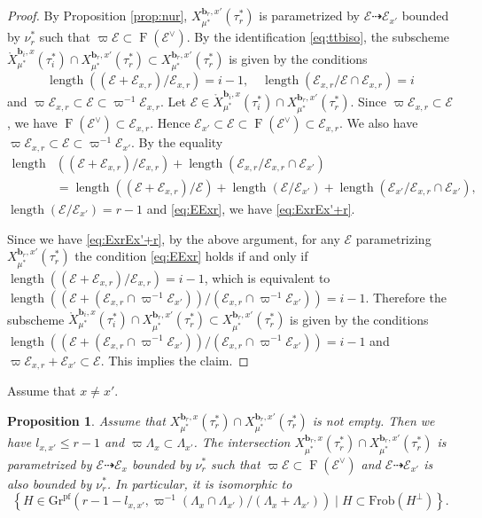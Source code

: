 \documentclass[12pt,a4paper]{article}
\newtheorem{prop}[thm]{Proposition}
\DeclareMathOperator{\length}{length}
\DeclareMathOperator{\oF}{F}
\newcommand{\bfb}{\mathbf{b}}
\newcommand{\cE}{\mathcal{E}}
\newcommand{\pf}{\mathrm{pf}}
\begin{document}
\begin{proof}
By Proposition \ref{prop:nur}, 
$X_{\mu^*}^{\bfb_r,x'}(\tau_r^*)$ is parametrized by $\cE \dashrightarrow \cE_{x'}$ 
bounded by $\nu_r^*$ such that $\varpi \cE \subset \oF (\cE^{\vee})$. 
By the identification \eqref{eq:ttbiso}, the subscheme 
$\mathring{X}_{\mu^*}^{\bfb_i,x}(\tau_i^*) \cap X_{\mu^*}^{\bfb_r,x'}(\tau_r^*) \subset X_{\mu^*}^{\bfb_r,x'}(\tau_r^*)$ is given by the conditions 
\begin{equation}\label{eq:EExr}
\length ((\cE +\cE_{x,r})/\cE_{x,r})=i-1, \quad 
\length (\cE_{x,r}/\cE \cap \cE_{x,r})=i 
\end{equation}
and $\varpi \cE_{x,r} \subset \cE \subset \varpi^{-1} \cE_{x,r}$. 
Let $\cE \in \mathring{X}_{\mu^*}^{\bfb_i,x}(\tau_i^*) \cap X_{\mu^*}^{\bfb_r,x'}(\tau_r^*)$. 
Since $\varpi \cE_{x,r} \subset \cE$, we have 
$\oF (\cE^{\vee}) \subset \cE_{x,r}$. Hence $\cE_{x'} \subset \cE \subset \oF (\cE^{\vee}) \subset \cE_{x,r}$. 
We also have $\varpi \cE_{x,r} \subset \cE \subset \varpi^{-1} \cE_{x'}$. 
By the equality 
\begin{align*}
\length & ((\cE+\cE_{x,r})/\cE_{x,r})+\length (\cE_{x,r}/\cE_{x,r} \cap \cE_{x'}) \\ 
 &= 
\length ((\cE+\cE_{x,r})/\cE) +\length (\cE /\cE_{x'}) + \length (\cE_{x'}/\cE_{x,r} \cap \cE_{x'}) , 
\end{align*}
$\length (\cE /\cE_{x'})=r-1$ and \eqref{eq:EExr}, we have 
\eqref{eq:ExrEx'+r}. 

Since we have \eqref{eq:ExrEx'+r}, by the above argument, for any $\cE$ parametrizing $X_{\mu^*}^{\bfb_r,x'}(\tau_r^*)$ the condition 
\eqref{eq:EExr} holds if and only if $\length ((\cE +\cE_{x,r})/\cE_{x,r})=i-1$, 
which is equivalent to 
$\length ((\cE +(\cE_{x,r}\cap \varpi^{-1} \cE_{x'}))/(\cE_{x,r}\cap \varpi^{-1} \cE_{x'}))=i-1$. 
Therefore the subscheme 
$\mathring{X}_{\mu^*}^{\bfb_i,x}(\tau_i^*) \cap X_{\mu^*}^{\bfb_r,x'}(\tau_r^*) \subset X_{\mu^*}^{\bfb_r,x'}(\tau_r^*)$ is given by the conditions 
$\length ((\cE +(\cE_{x,r}\cap \varpi^{-1} \cE_{x'}))/(\cE_{x,r}\cap \varpi^{-1} \cE_{x'}))=i-1$ and $\varpi \cE_{x,r} +\cE_{x'} \subset \cE$. This implies the claim. 
\end{proof}


Assume that $x \neq x'$. 


\begin{prop}\label{prop:intneqrr}
Assume that $X_{\mu^*}^{\bfb_r,x}(\tau_r^*) \cap X_{\mu^*}^{\bfb_r,x'}(\tau_r^*)$ is not empty. 
Then we have $l_{x,x'} \leq r-1$ and 
$\varpi \Lambda_x \subset \Lambda_{x'}$. 
The intersection $X_{\mu^*}^{\bfb_r,x}(\tau_r^*) \cap X_{\mu^*}^{\bfb_r,x'}(\tau_r^*)$ is parametrized by $\cE \dashrightarrow \cE_x$ bounded by 
$\nu_r^*$ such that 
$\varpi \cE \subset \oF (\cE^{\vee})$ and $\cE \dashrightarrow \cE_{x'}$ is also bounded by 
$\nu_r^*$. In particular, it is isomorphic to
$$\left\{ H \in \mathrm{Gr}^{\pf}(r-1-l_{x,x'}, \varpi^{-1} (\Lambda_x \cap \Lambda_{x'}) / (\Lambda_x + \Lambda_{x'}) ) \mid H \subset \mathrm{Frob}(H^\perp) \right\}.$$
\end{prop}
\end{document}
